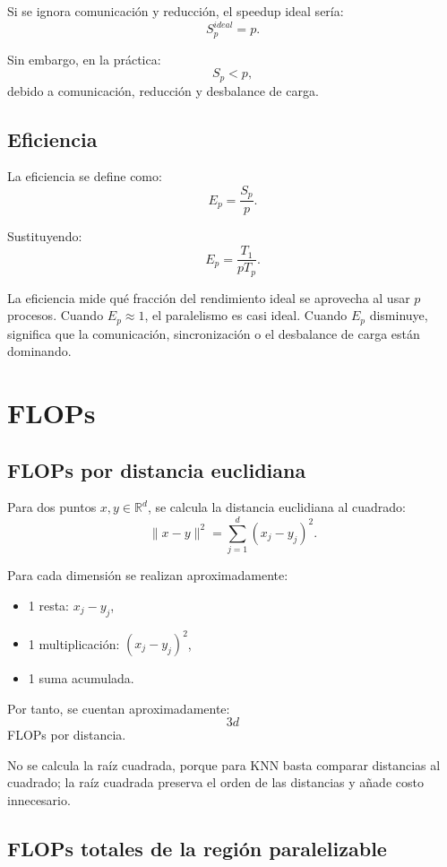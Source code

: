 \documentclass[11pt,a4paper]{article}
\begin{document}
Si se ignora comunicación y reducción, el speedup ideal sería:
\[
S_p^{ideal} = p.
\]

Sin embargo, en la práctica:
\[
S_p < p,
\]
debido a comunicación, reducción y desbalance de carga.

\subsection{Eficiencia}

La eficiencia se define como:
\[
E_p = \frac{S_p}{p}.
\]

Sustituyendo:
\[
\boxed{
E_p
=
\frac{T_1}{pT_p}
}.
\]

La eficiencia mide qué fracción del rendimiento ideal se aprovecha al usar $p$ procesos.
Cuando $E_p \approx 1$, el paralelismo es casi ideal. Cuando $E_p$ disminuye, significa que
la comunicación, sincronización o el desbalance de carga están dominando.

\section{FLOPs}

\subsection{FLOPs por distancia euclidiana}

Para dos puntos $x,y \in \mathbb{R}^d$, se calcula la distancia euclidiana al cuadrado:
\[
\|x-y\|^2 = \sum_{j=1}^{d}(x_j-y_j)^2.
\]

Para cada dimensión se realizan aproximadamente:
\begin{itemize}
    \item 1 resta: $x_j-y_j$,
    \item 1 multiplicación: $(x_j-y_j)^2$,
    \item 1 suma acumulada.
\end{itemize}

Por tanto, se cuentan aproximadamente:
\[
3d
\]
FLOPs por distancia.

No se calcula la raíz cuadrada, porque para KNN basta comparar distancias al cuadrado; la raíz
cuadrada preserva el orden de las distancias y añade costo innecesario.

\subsection{FLOPs totales de la región paralelizable}
\end{document}
